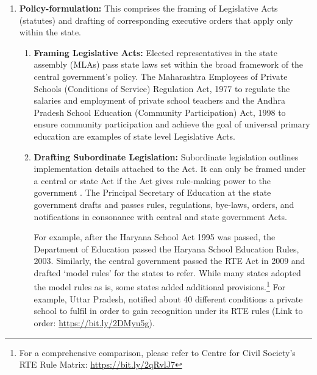 \documentclass[a4paper, 12pt, twoside]{article}
\begin{document}
\begin{enumerate} 
\item \textbf{Policy-formulation:} This comprises the framing of Legislative Acts (statutes) and drafting of corresponding executive orders that apply only within the state. 

\begin{enumerate}
\item \textbf{Framing Legislative Acts:} Elected representatives in the state assembly (MLAs) pass state laws set within the broad framework of the central government’s policy. The Maharashtra Employees of Private Schools (Conditions of Service) Regulation Act, 1977 to regulate the salaries and employment of private school teachers and the Andhra Pradesh School Education (Community Participation) Act, 1998 to ensure community participation and achieve the goal of universal primary education are examples of state level Legislative Acts. 

\newpage
\item \textbf{Drafting Subordinate Legislation:} Subordinate legislation outlines implementation details attached to the Act. It can only be framed under a central or state Act if the Act gives rule-making power to the government \parencite{exec_rule_making}. The Principal Secretary of Education at the state government drafts and passes rules, regulations, bye-laws, orders, and notifications in consonance with central and state government Acts. 

For example, after the  Haryana School Act 1995 was passed, the Department of Education passed the Haryana School Education Rules, 2003. Similarly, the central government passed the RTE Act in 2009 and drafted ‘model rules’ for the states to refer. While many states adopted the model rules as is, some states added additional provisions.\footnote{For a comprehensive comparison, please refer to Centre for Civil Society’s RTE Rule Matrix: \href{https://bit.ly/2qRvlJ7}{https://bit.ly/2qRvlJ7}} For example,  Uttar Pradesh, notified about 40 different conditions a private school to fulfil in order to gain recognition under its RTE rules (Link to order: \href{https://bit.ly/2DMyu5g}{https://bit.ly/2DMyu5g}).


\end{enumerate}
\end{enumerate}
\end{document}
